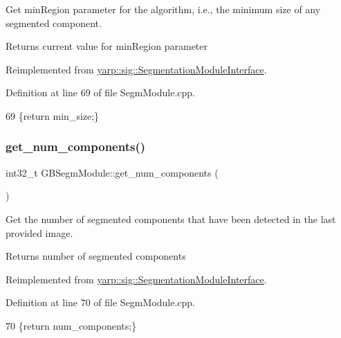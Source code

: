 Get min\+Region parameter for the algorithm, i.\+e., the minimum size of any segmented component. 

\begin{DoxyReturn}{Returns}
current value for min\+Region parameter 
\end{DoxyReturn}


Reimplemented from \hyperlink{classyarp_1_1sig_1_1SegmentationModuleInterface_a6c184aeea894f6afcc342c5aa748429d}{yarp\+::sig\+::\+Segmentation\+Module\+Interface}.



Definition at line 69 of file Segm\+Module.\+cpp.


\begin{DoxyCode}
69 \{\textcolor{keywordflow}{return} min\_size;\}
\end{DoxyCode}
\mbox{\label{classGBSegmModule_a655ee7c895eed07b07099133b9d8ce68}} 
\subsubsection{\texorpdfstring{get\+\_\+num\+\_\+components()}{get\_num\_components()}}
{\footnotesize\ttfamily int32\+\_\+t G\+B\+Segm\+Module\+::get\+\_\+num\+\_\+components (\begin{DoxyParamCaption}{ }\end{DoxyParamCaption})\hspace{0.3cm}{\ttfamily [virtual]}}



Get the number of segmented components that have been detected in the last provided image. 

\begin{DoxyReturn}{Returns}
number of segmented components 
\end{DoxyReturn}


Reimplemented from \hyperlink{classyarp_1_1sig_1_1SegmentationModuleInterface_a253cb5a4d4250b97842537b664a93064}{yarp\+::sig\+::\+Segmentation\+Module\+Interface}.



Definition at line 70 of file Segm\+Module.\+cpp.


\begin{DoxyCode}
70 \{\textcolor{keywordflow}{return} num\_components;\}
\end{DoxyCode}
\mbox{\label{classGBSegmModule_ae32ae1b1461e19c3a1b2f429c729ed03}} 
